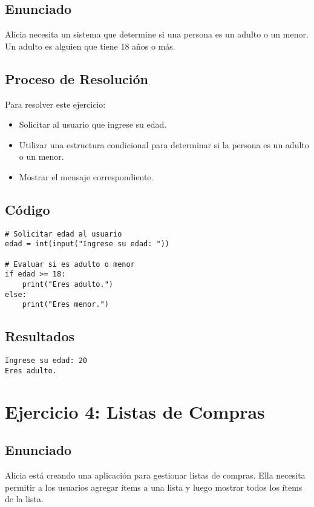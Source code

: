 \documentclass[a4paper,12pt]{article}
\begin{document}
\subsection{Enunciado}
Alicia necesita un sistema que determine si una persona es un adulto o un menor. Un adulto es alguien que tiene 18 años o más.

\subsection{Proceso de Resolución}
Para resolver este ejercicio:
\begin{itemize}
    \item Solicitar al usuario que ingrese su edad.
    \item Utilizar una estructura condicional para determinar si la persona es un adulto o un menor.
    \item Mostrar el mensaje correspondiente.
\end{itemize}

\subsection{Código}
\begin{lstlisting}
# Solicitar edad al usuario
edad = int(input("Ingrese su edad: "))

# Evaluar si es adulto o menor
if edad >= 18:
    print("Eres adulto.")
else:
    print("Eres menor.")
\end{lstlisting}

\subsection{Resultados}
\begin{verbatim}
Ingrese su edad: 20
Eres adulto.
\end{verbatim}

\newpage
\section{Ejercicio 4: Listas de Compras}

\subsection{Enunciado}
Alicia está creando una aplicación para gestionar listas de compras. Ella necesita permitir a los usuarios agregar ítems a una lista y luego mostrar todos los ítems de la lista.
\end{document}
